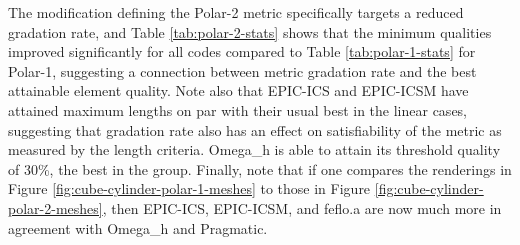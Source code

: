 \documentclass[3p,times,procedia,number]{elsarticle}
\begin{document}
The modification defining the Polar-2 metric specifically targets
a reduced gradation rate, and Table \ref{tab:polar-2-stats}
shows that the minimum qualities improved significantly for all
codes compared to Table \ref{tab:polar-1-stats} for Polar-1, suggesting a
connection between metric gradation rate and the best attainable
element quality.
Note also that EPIC-ICS and EPIC-ICSM have attained maximum lengths
on par with their usual best in the linear cases, suggesting that
gradation rate also has an effect on satisfiability of the metric
as measured by the length criteria.
Omega\_h is able to attain its threshold quality of 30\%, the best in the group.
Finally, note that if one compares the renderings
in Figure \ref{fig:cube-cylinder-polar-1-meshes} to those in
Figure \ref{fig:cube-cylinder-polar-2-meshes}, then EPIC-ICS,
EPIC-ICSM, and feflo.a are now much more in agreement with
Omega\_h and Pragmatic.
\end{document}

